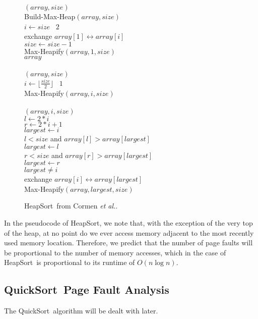 \documentclass[11pt]{article}
\newcommand{\heapsort}{{\sc HeapSort}}
\newcommand{\quicksort}{{\sc QuickSort}}
\begin{document}
\begin{figure}
\begin{algorithm}
$(array, size)$\+\\
    Build-Max-Heap$(array, size)$\\
    \For $i \gets size$ \DownTo\ $2$\+\\
        exchange $array[1] \leftrightarrow array[i]$\\
        $size \gets size - 1$\\
        Max-Heapify$(array, 1, size)$\-\\
    \Return $array$\-\\
\\
$(array, size)$\+\\
    \For $i \gets \lfloor \frac{size}{2} \rfloor$ \DownTo\ $1$\+\\
        Max-Heapify$(array, i, size)$\-\-\\
\\
$(array, i, size)$\+\\
    $l \gets 2*i$\\
    $r \gets 2*i + 1$\\
    $largest \gets i$\\
    \If $l < size$ and $array[l] > array[largest]$\+\\
            $largest \gets l$\-\\
    \If $r < size$ and $array[r] > array[largest]$\+\\
            $largest \gets r$\-\\
    \If $largest \neq i$\+\\
        exchange $array[i] \leftrightarrow array[largest]$\\
        Max-Heapify$(array, largest, size)$
\end{algorithm}

\caption{\heapsort\ from Cormen {\it et al.}\cite{clrs}.}
\label{fig:hsort}
\end{figure}

In the pseudocode of \heapsort, we note that, with the exception of the very
top of the heap, at no point do we ever access memory adjacent to the most
recently used memory location.  Therefore, we predict that the number of page
faults will be proportional to the number of memory accesses, which in the case
of \heapsort\ is proportional to its runtime of $O(n \log n)$.

\subsection{\quicksort\ Page Fault Analysis}
The \quicksort\ algorithm will be dealt with later.
\end{document}
